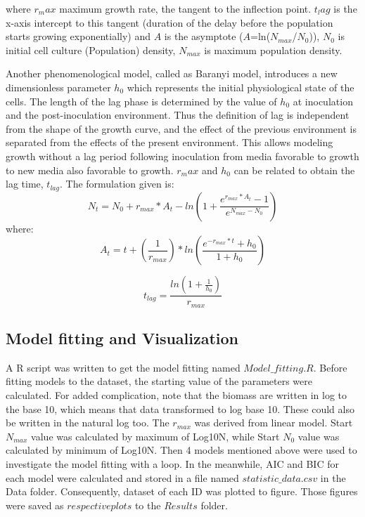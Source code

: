 \documentclass[11pt]{article}
\begin{document}
where $r_max$ maximum growth rate, the tangent to the inflection point.  $t_lag$ is the x-axis intercept to this tangent (duration of the delay before the population starts growing exponentially) and $A$ is the asymptote ($A$=ln($N_{max}$/$N_0$)), $N_0$ is initial cell culture (Population) density, $N_{max}$ is maximum population density.

Another  phenomenological model, called as Baranyi model, introduces a new dimensionless parameter $h_0$ which represents the initial physiological state of the cells. The length of the lag phase is determined by the value of $h_0$ at inoculation and the post-inoculation environment. Thus the definition of lag is independent from the shape of the growth curve, and the effect of the previous environment is separated from the effects of the present environment. This allows modeling growth without a lag period following inoculation from media favorable to growth to new media also favorable to growth.   $r_max$ and $h_0$ can be related to obtain the lag time, $t_{lag}$. The  formulation given is:
\begin{equation}
N_t = N_0 + r_{max}*{A_t} - ln(1 + \frac{e^{r_{max}*{A_t}} -1}{e^{N_{max} - N_0}}) 
\label{eqn:Baranyi} \tag{4}
\end{equation}
where: 
\begin{equation}
A_t = t + (\frac{1}{r_{max}}) * ln(\frac{e^{-r_{max}*t} + h_0} {1 + h_0})
\label{eqn:Baranyi_A} \tag{4.2}
\end{equation}

\begin{equation}
t_{lag} = \frac{ln(1 + \frac{1}{h_0})} {r_{max}}
\label{eqn:Baranyi_t} \tag{4.3}
\end{equation}


\subsection{Model fitting and Visualization}
A R script was written to get the model fitting named $ Model\_fitting.R$. Before fitting models to the dataset, the starting value of the parameters were calculated. For added complication, note that the biomass are written in log to the base 10, which means that data transformed to log base 10. These could also be written in the natural log too. The $r_{max}$ was derived from linear model. Start $N_{max}$ value was calculated by maximum of Log10N, while Start $N_0$ value was calculated by minimum of Log10N. Then 4 models mentioned above were used to investigate the model fitting with a loop. In the meanwhile, AIC and BIC for each model were calculated and stored in a file named $statistic\_data.csv$ in the Data folder. Consequently, dataset of each ID was plotted to figure. Those figures were saved as $respectiveplots$ to the $Results$ folder. 
\end{document}
